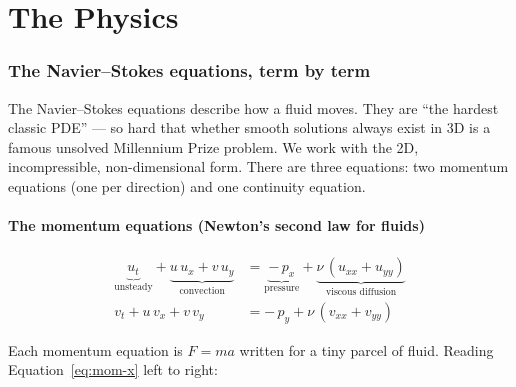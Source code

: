 \documentclass[11pt,a4paper]{article}
\begin{document}
\part{The Physics}
\label{part:physics}

\section{The Navier--Stokes equations, term by term}
\label{sec:ns-equations}

The Navier--Stokes equations describe how a fluid moves. They are ``the hardest
classic PDE'' --- so hard that whether smooth solutions always exist in 3D is a
famous unsolved Millennium Prize problem. We work with the 2D, incompressible,
non-dimensional form. There are three equations: two momentum equations (one per
direction) and one continuity equation.

\subsection{The momentum equations (Newton's second law for fluids)}

\begin{align}
\underbrace{u_t}_{\text{unsteady}}
+ \underbrace{u\,u_x + v\,u_y}_{\text{convection}}
&= \underbrace{-\,p_x}_{\text{pressure}}
+ \underbrace{\nu\,(u_{xx} + u_{yy})}_{\text{viscous diffusion}}
\label{eq:mom-x}\\[4pt]
v_t + u\,v_x + v\,v_y
&= -\,p_y + \nu\,(v_{xx} + v_{yy})
\label{eq:mom-y}
\end{align}

Each momentum equation is $F = ma$ written for a tiny parcel of fluid. Reading
Equation~\eqref{eq:mom-x} left to right:
\end{document}
